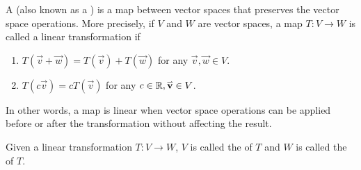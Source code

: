 
\begin{definition}
A  (also known as a )
is a map between vector spaces that preserves the vector space operations.
More precisely, if \(V\) and $W$ are vector spaces, a map
\(T:V\rightarrow W\) is called a linear transformation if
\begin{enumerate}
\item \(T(\vec{v}+\vec{w}) = T(\vec{v})+T(\vec{w})\)
      for any \(\vec{v},\vec{w} \in V\).
\item \(T(c\vec{v}) = cT(\vec{v})\)
      for any \(c \in \mathbb{R},\mathbf{\accentset{\rightharpoonup}{v}} \in V\).
\end{enumerate}
In other words, a map is linear when vector space operations
can be applied before or after the transformation without affecting the result.
\end{definition}

\begin{definition}
Given a linear transformation \(T:V\to W\),
\(V\) is called the  of \(T\) and
\(W\) is called the  of \(T\).

\begin{center}
\end{center}
\end{definition}

